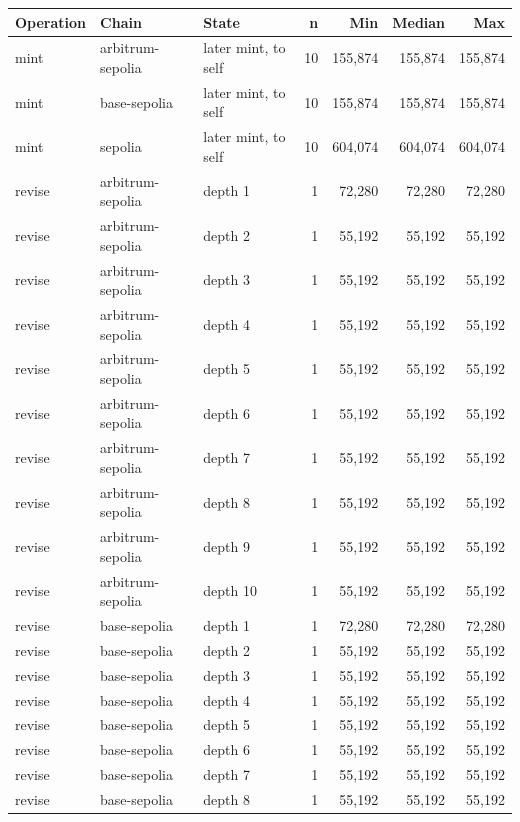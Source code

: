\begin{table}[htbp]
    \centering
    \small
    \begin{tabular}{lllrrrr}
    \toprule
    Operation & Chain & State & n & Min & Median & Max \\
    \midrule
    mint & arbitrum-sepolia & later mint, to self & 10 & 155,874 & 155,874 & 155,874 \\
    mint & base-sepolia & later mint, to self & 10 & 155,874 & 155,874 & 155,874 \\
    mint & sepolia & later mint, to self & 10 & 604,074 & 604,074 & 604,074 \\
    revise & arbitrum-sepolia & depth 1 & 1 & 72,280 & 72,280 & 72,280 \\
    revise & arbitrum-sepolia & depth 2 & 1 & 55,192 & 55,192 & 55,192 \\
    revise & arbitrum-sepolia & depth 3 & 1 & 55,192 & 55,192 & 55,192 \\
    revise & arbitrum-sepolia & depth 4 & 1 & 55,192 & 55,192 & 55,192 \\
    revise & arbitrum-sepolia & depth 5 & 1 & 55,192 & 55,192 & 55,192 \\
    revise & arbitrum-sepolia & depth 6 & 1 & 55,192 & 55,192 & 55,192 \\
    revise & arbitrum-sepolia & depth 7 & 1 & 55,192 & 55,192 & 55,192 \\
    revise & arbitrum-sepolia & depth 8 & 1 & 55,192 & 55,192 & 55,192 \\
    revise & arbitrum-sepolia & depth 9 & 1 & 55,192 & 55,192 & 55,192 \\
    revise & arbitrum-sepolia & depth 10 & 1 & 55,192 & 55,192 & 55,192 \\
    revise & base-sepolia & depth 1 & 1 & 72,280 & 72,280 & 72,280 \\
    revise & base-sepolia & depth 2 & 1 & 55,192 & 55,192 & 55,192 \\
    revise & base-sepolia & depth 3 & 1 & 55,192 & 55,192 & 55,192 \\
    revise & base-sepolia & depth 4 & 1 & 55,192 & 55,192 & 55,192 \\
    revise & base-sepolia & depth 5 & 1 & 55,192 & 55,192 & 55,192 \\
    revise & base-sepolia & depth 6 & 1 & 55,192 & 55,192 & 55,192 \\
    revise & base-sepolia & depth 7 & 1 & 55,192 & 55,192 & 55,192 \\
    revise & base-sepolia & depth 8 & 1 & 55,192 & 55,192 & 55,192 \\

\end{tabular}
\end{table}
